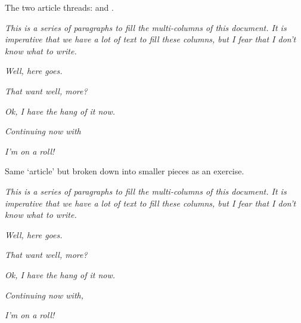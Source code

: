 \documentclass{article}
\begin{document}
\noindent
The two article threads: 
and .

%

\raggedcolumns
\begin{multicols}{2}
\noindent\makebox[0pt][r]{\showArticlePaneRead{}{11bp}\hspace{\marginparsep}}%
%
\textsl{This is a series of paragraphs to fill the multi-columns of this document. It is imperative
that we have a lot of text to fill these columns, but I fear that I don't know what to write.}

\textsl{Well, here goes.} \lipsum[2]

\textsl{That want well, more?} \lipsum[4]

\textsl{Ok, I have the hang of it now.} \lipsum[6]

\noindent{}\indent
\textsl{Continuing now with} \lipsum[8]

\textsl{I'm on a roll!} \lipsum[10]

\end{multicols}

\newpage

\noindent{}%
Same `article' but broken down into smaller pieces as an exercise.

%
\begin{multicols}{2}\previewOn %
\noindent{}%
\textsl{This is a series of paragraphs to fill the multi-columns of this document. It is imperative
that we have a lot of text to fill these columns, but I fear that I don't know what to write.}

\textsl{Well, here goes.} \lipsum[2]

\noindent{}\indent
\textsl{That want well, more?} \lipsum[4]

\textsl{Ok, I have the hang of it now.} \lipsum[6]

\noindent{}\indent
\textsl{Continuing now with,} \lipsum[8]

\noindent{}\indent
\textsl{I'm on a roll!} \lipsum[10]

\end{multicols}
\end{document}
